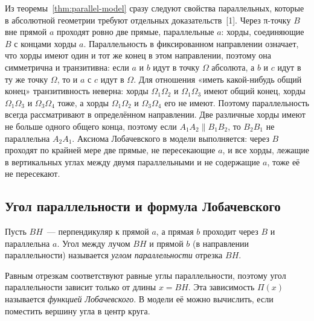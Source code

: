Из теоремы~\ref{thm:parallel-model} сразу следуют свойства параллельных, которые в абсолютной геометрии требуют отдельных доказательств~[1]. Через π-точку $B$ вне прямой $a$ проходят ровно две прямые, параллельные $a$: хорды, соединяющие $B$ с концами хорды $a$. Параллельность в фиксированном направлении означает, что хорды имеют один и тот же конец в этом направлении, поэтому она симметрична и транзитивна: если $a$ и $b$ идут в точку $\Omega$ абсолюта, а $b$ и $c$ идут в ту же точку $\Omega$, то и $a$ с $c$ идут в $\Omega$. Для отношения «иметь какой-нибудь общий конец» транзитивность неверна: хорды $\Omega_1\Omega_2$ и $\Omega_1\Omega_3$ имеют общий конец, хорды $\Omega_1\Omega_3$ и $\Omega_3\Omega_4$ тоже, а хорды $\Omega_1\Omega_2$ и $\Omega_3\Omega_4$ его не имеют. Поэтому параллельность всегда рассматривают в определённом направлении. Две различные хорды имеют не больше одного общего конца, поэтому если $A_1A_2\parallel B_1B_2$, то $B_2B_1$ не параллельна $A_2A_1$. Аксиома Лобачевского в модели выполняется: через $B$ проходят по крайней мере две прямые, не пересекающие $a$, и все хорды, лежащие в вертикальных углах между двумя параллельными и не содержащие $a$, тоже её не пересекают.

\subsection{Угол параллельности и формула Лобачевского}

\begin{definition}[\!\!{[1]}]
Пусть $BH$~--- перпендикуляр к прямой $a$, а прямая $b$ проходит через $B$ и параллельна $a$. Угол между лучом $BH$ и прямой $b$ (в направлении параллельности) называется \emph{углом параллельности} отрезка $BH$.
\end{definition}

Равным отрезкам соответствуют равные углы параллельности, поэтому угол параллельности зависит только от длины $x=BH$. Эта зависимость $\Pi(x)$ называется \emph{функцией Лобачевского}. В модели её можно вычислить, если поместить вершину угла в центр круга.


